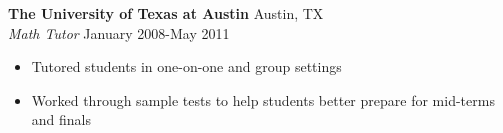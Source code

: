 \documentclass[line,margin,letterpaper]{res}
\begin{document}
\begin{resume}
  {\bf The University of Texas at Austin} \hfill Austin, TX \\
  \emph{Math Tutor} \hfill January 2008-May 2011
  \begin{itemize} \itemsep -2pt
    \item Tutored students in one-on-one and group settings
    \item Worked through sample tests to help students better prepare for
    mid-terms and finals
  \end{itemize}



\end{resume}
\end{document}
